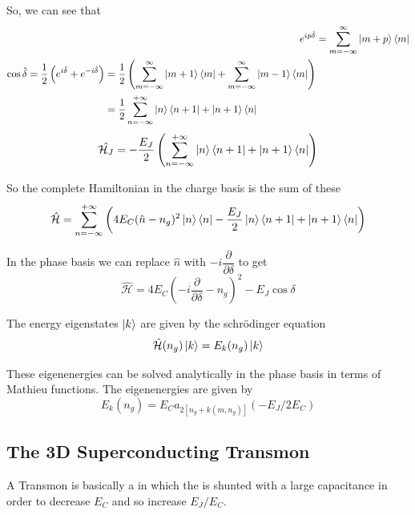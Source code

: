 So, we can see that
\begin{align}
e^{ip\hat{\delta}}&=\sum_{m=-\infty}^\infty \ket{m+p}\bra{m}\\
\begin{split}
\cos\hat{\delta}=\frac{1}{2}\left(e^{i\hat{\delta}}+e^{-i\hat{\delta}}\right)&=\frac{1}{2}\left(\sum_{m=-\infty}^\infty \ket{m+1}\bra{m}+\sum_{m=-\infty}^\infty \ket{m-1}\bra{m}\right)\\
&=\frac{1}{2}\sum_{n=-\infty}^{+\infty}\ket{n}\bra{n+1}+\ket{n+1}\bra{n}
\end{split}
\end{align}
\begin{equation}
\hat{\mathcal{H}_J}=-\frac{E_J}{2}\left(\sum_{n=-\infty}^{+\infty}\ket{n}\bra{n+1}+\ket{n+1}\bra{n}\right)
\end{equation} 

So the complete Hamiltonian in the charge basis is the sum of these
\begin{equation}
\hat{\mathcal{H}}=\sum_{n=-\infty}^{+\infty}\left(4E_C(\hat{n}-n_g)^2\ket{n}\bra{n}-\frac{E_J}{2}\ket{n}\bra{n+1}+\ket{n+1}\bra{n}\right)
\end{equation}

In the phase basis we can replace $\hat{n}$ with $-i\dfrac{\partial}{\partial\delta}$ to get
\begin{equation}
\hat{\mathcal{H}}=4E_C\left(-i\frac{\partial}{\partial\delta}-n_g\right)^2-E_J\cos\delta
\end{equation}

The energy eigenstates $\ket{k}$ are given by the schr\"{o}dinger equation
\begin{equation}
\hat{\mathcal{H}}(n_g)\ket{k}=E_k(n_g)\ket{k}
\end{equation}

These eigenenergies can be solved analytically in the phase basis in terms of Mathieu functions. The eigenenergies are given by \cite{Koch2007a}
\begin{equation}
E_k(n_g)=E_Ca_{2[n_g+k(m,n_g)]}(-E_J/2E_C)
\end{equation}

\subsection{The 3D Superconducting Transmon}

A Transmon is basically a \CPB in which the \JJ is shunted with a large capacitance in order to decrease $E_C$ and so increase $E_J/E_C$.

